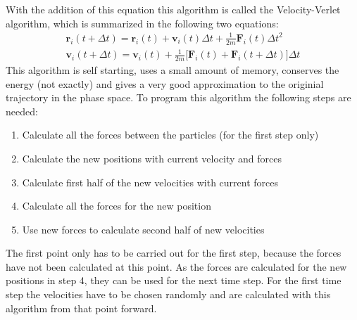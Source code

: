 \documentclass[12pt]{article}
\begin{document}
With the addition of this equation this algorithm is called the Velocity-Verlet algorithm, which is summarized in the following two equations:
\begin{equation}
    \label{eq:velocityverlet}
    \begin{aligned}
        \mathbf{r}_i(t+\Delta t) = \mathbf{r}_i(t) + {\mathbf{v}}_i(t) \Delta t + \frac1{2m} {\mathbf{F}}_i(t) \Delta t^2\\
        \mathbf{v}_i(t+\Delta t) = \mathbf{v}_i(t) + \frac1{2m} \Big[\mathbf{F}_i(t) + \mathbf{F}_i(t+\Delta t)\Big] \Delta t
    \end{aligned}
\end{equation}
This algorithm is self starting, uses a small amount of memory, conserves the energy (not exactly) 
and gives a very good approximation to the originial trajectory
in the phase space. To program this algorithm the following steps are needed: 
\begin{enumerate}
    \item Calculate all the forces between the particles (for the first step only)
    \item Calculate the new positions with current velocity and forces
    \item Calculate first half of the new velocities with current forces
    \item Calculate all the forces for the new position
    \item Use new forces to calculate second half of new velocities
\end{enumerate}
The first point only has to be carried out for the first step, because the forces have not been calculated at this point. As the forces are calculated
for the new positions in step 4, they can be used for the next time step. For the first time step the velocities have to be chosen randomly and are 
calculated with this algorithm from that point forward.
\end{document}
